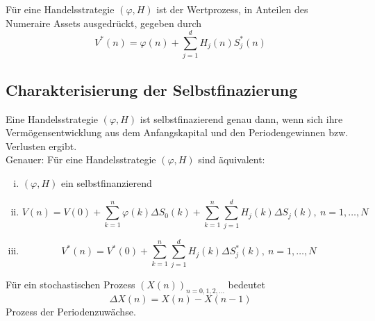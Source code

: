 Für eine Handelsstrategie $(\varphi,H)$ ist der Wertprozess, in Anteilen des Numeraire Assets ausgedrückt, gegeben durch
\[
V^*(n) = \varphi(n)+\sum_{j=1}^{d}H_j(n)S_j^*(n)
\]

\subsection{Charakterisierung der Selbstfinazierung}
\label{sub:charkt_selbstfinazierung}
Eine Handelsstrategie $(\varphi,H)$ ist selbstfinazierend genau dann, wenn sich ihre Vermögensentwicklung aus dem Anfangskapital und den Periodengewinnen bzw. Verlusten ergibt.\\
Genauer: Für eine Handelsstrategie $(\varphi,H)$ sind äquivalent:
\begin{enumerate}[(i)]
	\item $(\varphi,H)$ ein selbstfinanzierend
	\item 
	\[
	V(n) = V(0)+\sum_{k=1}^{n}\varphi(k)\Delta S_0(k) + \sum_{k=1}^{n}\sum_{j=1}^{d}H_j(k)\Delta S_j(k),~n=1,\dots,N
	\]
	\item 
	\[
	V^*(n)= V^*(0)+\sum_{k=1}^{n}\sum_{j=1}^{d} H_j(k)\Delta S_j^*(k),~ n=1,\dots,N
	\]
\end{enumerate}
Für ein stochastischen Prozess $(X(n))_{n=0,1,2,\dots}$ bedeutet 
\[
\Delta X(n)= X(n)-X(n-1)
\]
Prozess der Periodenzuwächse.


\cleardoubleoddemptypage
{}
\setcounter{page}{1}


\printindex
\listoffigures
